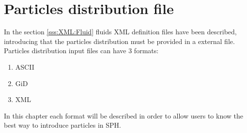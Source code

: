 \section{Particles distribution file}
\label{ss:partsFile}
%
In the section \ref{sss:XML:Fluid} fluids XML definition files have been
described, introducing that the particles distribution must be provided
in a external file. Particles distribution input files can have 3 formats:
%
\begin{enumerate}
	\item ASCII
	\item GiD
	\item XML
\end{enumerate}
%
In this chapter each format will be described in order to allow users to know the best way to introduce particles
in SPH.
%



%
